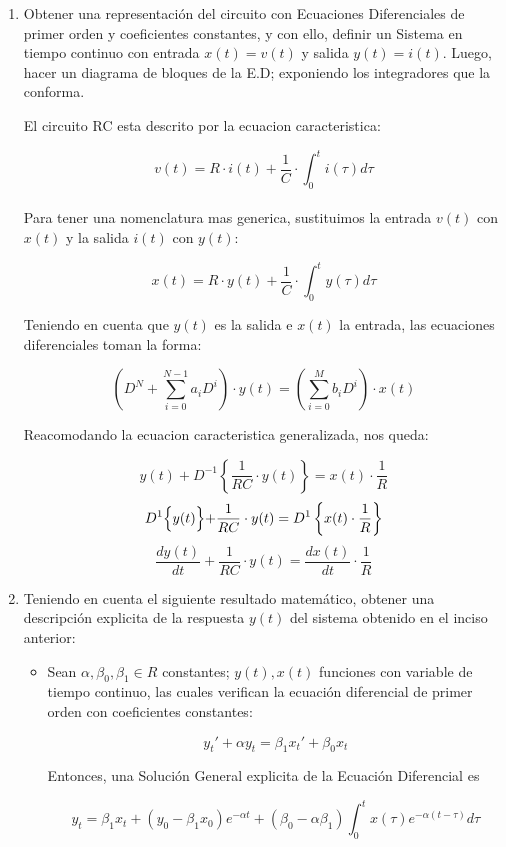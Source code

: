 \documentclass[12pt,a4paper]{report}
\begin{document}
  \begin{enumerate}[label=\alph*)]
    \item Obtener una representación del circuito con Ecuaciones Diferenciales de primer orden y coeficientes
      constantes, y con ello, definir un Sistema en tiempo continuo con entrada $x(t) = v(t)$ y salida $y(t) = i(t)$.
      Luego, hacer un diagrama de bloques de la E.D; exponiendo los integradores que la conforma.

      El circuito RC esta descrito por la ecuacion caracteristica:

      $$v(t) = R\cdot i(t) + \frac{1}{C} \cdot \int_{0}^{t} i(\tau) d\tau$$\\[2pt]

      Para tener una nomenclatura mas generica, sustituimos la entrada $v(t)$ con $x(t)$ y la salida $i(t)$ con $y(t)$:

      $$x(t) = R\cdot y(t) + \frac{1}{C} \cdot \int_{0}^{t} y(\tau) d\tau$$

      Teniendo en cuenta que $y(t)$ es la salida e $x(t)$ la entrada, las ecuaciones diferenciales toman la forma:

      $$\left(D^N + \sum_{i=0}^{N-1} a_i D^i\right) \cdot y(t) = \left(\sum_{i=0}^{M} b_i D^i\right) \cdot x(t)$$

      Reacomodando la ecuacion caracteristica generalizada, nos queda:

      $$y(t) + D^{-1} \left\{\frac{1}{RC} \cdot y(t) \right\} = x(t) \cdot \frac{1}{R}$$
      $$D^1\Bigl\{y(t) \Bigl\} + \frac{1}{RC} \cdot y(t) = D^1\left\{x(t) \cdot \frac{1}{R} \right\}$$
      $$\frac{dy(t)}{dt} + \frac{1}{RC} \cdot y(t) = \frac{dx(t)}{dt} \cdot \frac{1}{R}$$

    \item Teniendo en cuenta el siguiente resultado matemático, obtener una descripción explicita
      de la respuesta $y(t)$ del sistema obtenido en el inciso anterior:
      \begin{itemize}
        \item Sean $\alpha, \beta_0, \beta_1 \in R$ constantes; $y(t), x(t)$ funciones con variable de tiempo continuo,
          las cuales verifican la ecuación diferencial de primer orden con coeficientes constantes:

          $$y_t'+\alpha y_t = \beta_1 x_t' + \beta_0 x_t$$

          Entonces, una Solución General explicita de la Ecuación Diferencial es

          $$y_t = \beta_1 x_t + (y_0 - \beta_1 x_0) e^{-\alpha t} + (\beta_0 - \alpha \beta_1) \int_{0}^{t} x(\tau)
          e^{-\alpha(t - \tau)} d\tau$$


\end{itemize}
\end{enumerate}
\end{document}
